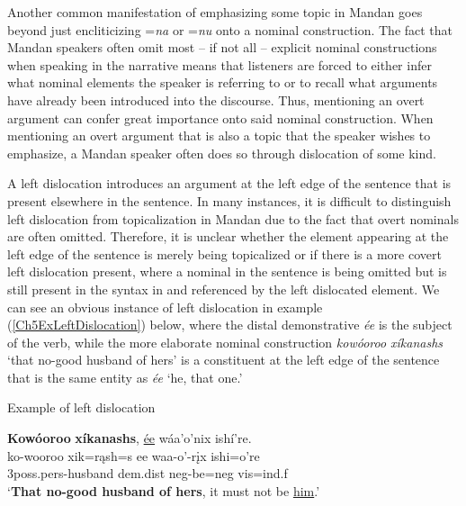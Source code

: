 Another common manifestation of emphasizing some topic in Mandan goes beyond just encliticizing =\textit{na} or =\textit{nu} onto a nominal construction. The fact that Mandan speakers often omit most -- if not all -- explicit nominal constructions when speaking in the narrative means that listeners are forced to either infer what nominal elements the speaker is referring to or to recall what arguments have already been introduced into the discourse. Thus, mentioning an overt argument can confer great importance onto said nominal construction. When mentioning an overt argument that is also a topic that the speaker wishes to emphasize, a Mandan speaker often does so through dislocation of some kind.

A left dislocation introduces an argument at the left edge of the sentence that is present elsewhere in the sentence. In many instances, it is difficult to distinguish left dislocation from topicalization in Mandan due to the fact that overt nominals are often omitted. Therefore, it is unclear whether the element appearing at the left edge of the sentence is merely being topicalized or if there is a more covert left dislocation present, where a nominal in the sentence is being omitted but is still present in the syntax in and referenced by the left dislocated element. We can see an obvious instance of left dislocation in example (\ref{Ch5ExLeftDislocation}) below, where the distal demonstrative \textit{ée} is the subject of the verb, while the more elaborate nominal construction \textit{kowóoroo xíkanashs} `that no-good husband of hers' is a constituent at the left edge of the sentence that is the same entity as \textit{ée} `he, that one.'

\begin{exe}

    \item\label{Ch5ExLeftDislocation} Example of left dislocation

        \glll \textbf{Kowóoroo} \textbf{xíkanashs}, \uline{ée} wáa'o'nix ishí're.\\
        ko-wooroo xik=rąsh=s ee waa-o'-rįx ishi=o're\\
        3poss.pers-\textnormal{husband} dem.dist neg-\textnormal{be}=neg vis=ind.f\\
        \glt `\textbf{That no-good husband of hers}, it must not be \uline{him}.' \citep[134]{hollow1973a}

        
\end{exe}

